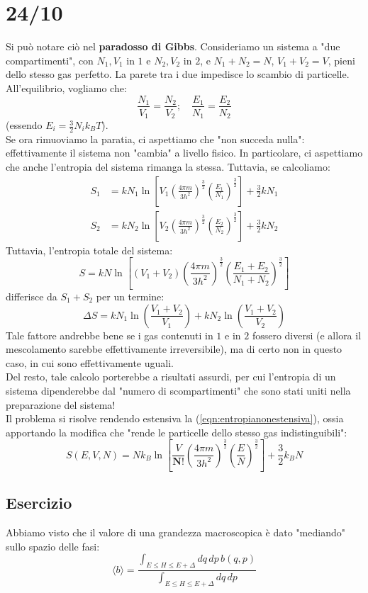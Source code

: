 \documentclass[12pt]{article}
\begin{document}
\section{24/10}
Si può notare ciò nel \textbf{paradosso di Gibbs}. Consideriamo un sistema a "due compartimenti", con $N_1,V_1$ in $1$ e $N_2,V_2$ in $2$, e $N_1+N_2=N$, $V_1+V_2=V$, pieni dello stesso gas perfetto. La parete tra i due impedisce lo scambio di particelle.\\
All'equilibrio, vogliamo che:
\[
\frac{N_1}{V_1} = \frac{N_2}{V_2}; \quad \frac{E_1}{N_1}=\frac{E_2}{N_2}
\]
(essendo $E_i = \frac{3}{2}N_i k_B T$).\\
Se ora rimuoviamo la paratia, ci aspettiamo che "non succeda nulla": effettivamente il sistema non "cambia" a livello fisico. In particolare, ci aspettiamo che anche l'entropia del sistema rimanga la stessa. Tuttavia, se calcoliamo:
\begin{align*}
S_1 &= k N_1 \ln\left[V_1 \left(\frac{4\pi m}{3h^2}\right)^\frac{3}{2}\left(\frac{E_1}{N_1}\right)^\frac{3}{2}\right]+\frac{3}{2}kN_1\\
S_2 &= k N_2 \ln\left[V_2 \left(\frac{4\pi m}{3h^2}\right)^\frac{3}{2}\left(\frac{E_2}{N_2}\right)^\frac{3}{2}\right]+\frac{3}{2}kN_2
\end{align*}
Tuttavia, l'entropia totale del sistema:
\[
S=kN\ln\left[(V_1+V_2)\left(\frac{4\pi m}{3h^2}\right)^\frac{3}{2}\left(\frac{E_1+E_2}{N_1+N_2}\right)^\frac{3}{2}\right]
\]
differisce da $S_1 + S_2$ per un termine:
\[
\Delta S = kN_1\ln\left(\frac{V_1+V_2}{V_1}\right)+kN_2\ln\left(\frac{V_1+V_2}{V_2}\right)
\]
Tale fattore andrebbe bene se i gas contenuti in $1$ e in $2$ fossero diversi (e allora il mescolamento sarebbe effettivamente irreversibile), ma di certo non in questo caso, in cui sono effettivamente uguali.\\
Del resto, tale calcolo porterebbe a risultati assurdi, per cui l'entropia di un sistema dipenderebbe dal "numero di scompartimenti" che sono stati uniti nella preparazione del sistema!\\
Il problema si risolve rendendo estensiva la (\ref{eqn:entropianonestensiva}), ossia apportando la modifica che "rende le particelle dello stesso gas indistinguibili":
\[
S(E,V,N) = Nk_B \ln\left[\frac{V}{\bm{N!}}\left(\frac{4\pi m}{3h^2}\right)^\frac{3}{2}\left(\frac{E}{N}\right)^\frac{3}{2}\right]+\frac{3}{2}k_B N
\]

\subsection{Esercizio}
Abbiamo visto che il valore di una grandezza macroscopica è dato "mediando" sullo spazio delle fasi:
\[
\langle b\rangle = \frac{\displaystyle \int_{E\leq H\leq E+\Delta}dq\,dp\,b(q,p)}{\displaystyle \int_{E\leq H\leq E+\Delta}dq\,dp}
\]
\end{document}
